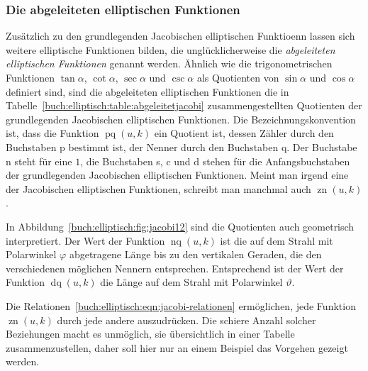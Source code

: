 \subsubsection{Die abgeleiteten elliptischen Funktionen}
Zusätzlich zu den grundlegenden Jacobischen elliptischen Funktioenn
lassen sich weitere elliptische Funktionen bilden, die unglücklicherweise
die {\em abgeleiteten elliptischen Funktionen} genannt werden.
Ähnlich wie die trigonometrischen Funktionen $\tan\alpha$, $\cot\alpha$,
$\sec\alpha$ und $\csc\alpha$ als Quotienten von $\sin\alpha$ und
$\cos\alpha$ definiert sind, sind die abgeleiteten elliptischen Funktionen
die in Tabelle~\ref{buch:elliptisch:table:abgeleitetjacobi} zusammengestellten
Quotienten der grundlegenden Jacobischen elliptischen Funktionen.
Die Bezeichnungskonvention ist, dass die Funktion $\operatorname{pq}(u,k)$
ein Quotient ist, dessen Zähler durch den Buchstaben p bestimmt ist,
der Nenner durch den Buchstaben q.
Der Buchstabe n steht für eine $1$, die Buchstaben s, c und d stehen für
die Anfangsbuchstaben der grundlegenden Jacobischen elliptischen
Funktionen.
Meint man irgend eine der Jacobischen elliptischen Funktionen, schreibt
man manchmal auch $\operatorname{zn}(u,k)$.

In Abbildung~\ref{buch:elliptisch:fig:jacobi12} sind die Quotienten auch
geometrisch interpretiert.
Der Wert der Funktion $\operatorname{nq}(u,k)$ ist die auf dem Strahl
mit Polarwinkel $\varphi$ abgetragene Länge bis zu den vertikalen
Geraden, die den verschiedenen möglichen Nennern entsprechen.
Entsprechend ist der Wert der Funktion $\operatorname{dq}(u,k)$ die
Länge auf dem Strahl mit Polarwinkel $\vartheta$.

Die Relationen~\ref{buch:elliptisch:eqn:jacobi-relationen}
ermöglichen, jede Funktion $\operatorname{zn}(u,k)$ durch jede
andere auszudrücken.
Die schiere Anzahl solcher Beziehungen macht es unmöglich, sie 
übersichtlich in einer Tabelle zusammenzustellen, daher soll hier
nur an einem Beispiel das Vorgehen gezeigt werden.


